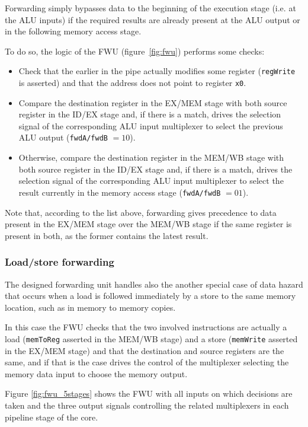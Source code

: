 \documentclass[a4paper]{article}
\begin{document}
Forwarding simply bypasses data to the beginning of the execution stage (i.e. at the ALU inputs) if the required results are already present at the ALU output or in the following memory access stage.

To do so, the logic of the FWU (figure~\ref{fig:fwu}) performs some checks:
\begin{itemize}
    \item Check that the earlier in the pipe actually modifies some register (\texttt{regWrite} is asserted) and that the address does not point to register \texttt{x0}.
    \item Compare the destination register in the EX/MEM stage with both source register in the ID/EX stage and, if there is a match, drives the selection signal of the corresponding ALU input multiplexer to select the previous ALU output (\texttt{fwdA/fwdB} $= 10$).
    \item Otherwise, compare the destination register in the MEM/WB stage with both source register in the ID/EX stage and, if there is a match, drives the selection signal of the corresponding ALU input multiplexer to select the result currently in the memory access stage (\texttt{fwdA/fwdB} $= 01$).
\end{itemize}

Note that, according to the list above, forwarding gives precedence to data present in the EX/MEM stage over the MEM/WB stage if the same register is present in both, as the former contains the latest result.

\subsubsection{Load/store forwarding}
The designed forwarding unit handles also the another special case of data hazard that occurs when a load is followed immediately by a store to the same memory location, such as in memory to memory copies.

In this case the FWU checks that the two involved instructions are actually a load (\texttt{memToReg} asserted in the MEM/WB stage) and a store (\texttt{memWrite} asserted in the EX/MEM stage) and that the destination and source registers are the same, and if that is the case drives the control of the multiplexer selecting the memory data input to choose the memory output.

Figure \ref{fig:fwu_5stages} shows the FWU with all inputs on which decisions are taken and the three output signals controlling the related multiplexers in each pipeline stage of the core.
\end{document}
